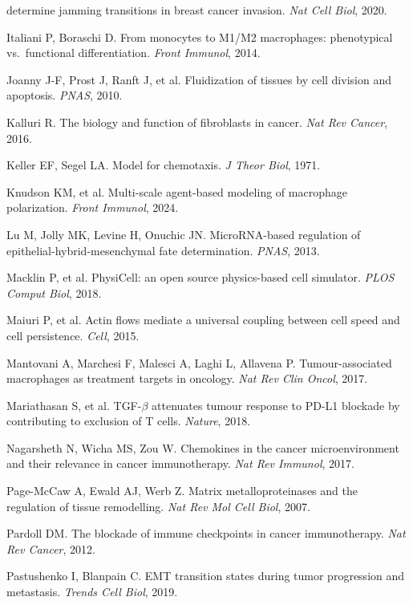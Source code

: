 \documentclass[11pt,letterpaper]{article}
\begin{document}
\begin{enumerate}[label={[\arabic*]}, leftmargin=*, itemsep=0pt]
        determine jamming transitions in breast cancer invasion.
        \emph{Nat Cell Biol}, 2020.
  \item Italiani P, Boraschi D. From monocytes to M1/M2 macrophages:
        phenotypical vs.\ functional differentiation.
        \emph{Front Immunol}, 2014.
  \item Joanny J-F, Prost J, Ranft J, et al. Fluidization of tissues by
        cell division and apoptosis. \emph{PNAS}, 2010.
  \item Kalluri R. The biology and function of fibroblasts in cancer.
        \emph{Nat Rev Cancer}, 2016.
  \item Keller EF, Segel LA. Model for chemotaxis.
        \emph{J Theor Biol}, 1971.
  \item Knudson KM, et al. Multi-scale agent-based modeling of
        macrophage polarization. \emph{Front Immunol}, 2024.
  \item Lu M, Jolly MK, Levine H, Onuchic JN. MicroRNA-based regulation
        of epithelial-hybrid-mesenchymal fate determination.
        \emph{PNAS}, 2013.
  \item Macklin P, et al. PhysiCell: an open source physics-based cell
        simulator. \emph{PLOS Comput Biol}, 2018.
  \item Maiuri P, et al. Actin flows mediate a universal coupling
        between cell speed and cell persistence. \emph{Cell}, 2015.
  \item Mantovani A, Marchesi F, Malesci A, Laghi L, Allavena P.
        Tumour-associated macrophages as treatment targets in
        oncology. \emph{Nat Rev Clin Oncol}, 2017.
  \item Mariathasan S, et al. TGF-$\beta$ attenuates tumour response to
        PD-L1 blockade by contributing to exclusion of T cells.
        \emph{Nature}, 2018.
  \item Nagarsheth N, Wicha MS, Zou W. Chemokines in the cancer
        microenvironment and their relevance in cancer immunotherapy.
        \emph{Nat Rev Immunol}, 2017.
  \item Page-McCaw A, Ewald AJ, Werb Z. Matrix metalloproteinases and
        the regulation of tissue remodelling.
        \emph{Nat Rev Mol Cell Biol}, 2007.
  \item Pardoll DM. The blockade of immune checkpoints in cancer
        immunotherapy. \emph{Nat Rev Cancer}, 2012.
  \item Pastushenko I, Blanpain C. EMT transition states during tumor
        progression and metastasis. \emph{Trends Cell Biol}, 2019.

\end{enumerate}
\end{document}
